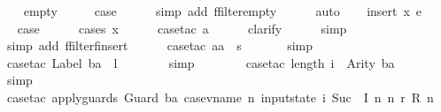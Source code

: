 \begin{isabellebody}
\ \ \isamarkupfalse%
\ empty\isanewline
\ \ \isamarkupfalse%
\ \isamarkupfalse%
\ {\isacharquery}case\isanewline
\ \ \ \ \isamarkupfalse%
\ {\isacharparenleft}simp\ add{\isacharcolon}\ ffilter{\isacharunderscore}empty{\isacharparenright}\isanewline
\ \ \ \ \isamarkupfalse%
\ auto\isanewline
{}\isamarkupfalse%
\isanewline
\ \ \isamarkupfalse%
\ {\isacharparenleft}insert\ x\ e{\isacharparenright}\isanewline
\ \ \isamarkupfalse%
\ \isamarkupfalse%
\ {\isacharquery}case\isanewline
\ \ \ \ \isamarkupfalse%
\ {\isacharparenleft}cases\ x{\isacharparenright}\isanewline
\ \ \ \ \isamarkupfalse%
\ {\isacharparenleft}case{\isacharunderscore}tac\ a{\isacharparenright}\isanewline
\ \ \ \ \isamarkupfalse%
\ clarify\isanewline
\ \ \ \ \isamarkupfalse%
\ simp\isanewline
\ \ \ \ \isamarkupfalse%
\ {\isacharparenleft}simp\ add{\isacharcolon}\ ffilter{\isacharunderscore}finsert{\isacharparenright}\isanewline
\ \ \ \ \isamarkupfalse%
\ {\isacharparenleft}case{\isacharunderscore}tac\ {\isachardoublequoteopen}aa\ {\isacharequal}\ s{\isachardoublequoteclose}{\isacharparenright}\isanewline
\ \ \ \ \ \isamarkupfalse%
\ simp\isanewline
\ \ \ \ \ \isamarkupfalse%
\ {\isacharparenleft}case{\isacharunderscore}tac\ {\isachardoublequoteopen}Label\ ba\ {\isacharequal}\ l{\isachardoublequoteclose}{\isacharparenright}\isanewline
\ \ \ \ \ \ \isamarkupfalse%
\ simp\isanewline
\ \ \ \ \ \ \isamarkupfalse%
\ {\isacharparenleft}case{\isacharunderscore}tac\ {\isachardoublequoteopen}length\ i\ {\isacharequal}\ Arity\ ba{\isachardoublequoteclose}{\isacharparenright}\isanewline
\ \ \ \ \ \ \ \isamarkupfalse%
\ simp\isanewline
\ \ \ \ \ \ \ \isamarkupfalse%
\ {\isacharparenleft}case{\isacharunderscore}tac\ {\isachardoublequoteopen}apply{\isacharunderscore}guards\ {\isacharparenleft}Guard\ ba{\isacharparenright}\ {\isacharparenleft}case{\isacharunderscore}vname\ {\isacharparenleft}{\isasymlambda}n{\isachardot}\ input{}state\ i\ {\isacharparenleft}Suc\ {}{\isacharparenright}\ {\isacharparenleft}I\ n{\isacharparenright}{\isacharparenright}\ {\isacharparenleft}{\isasymlambda}n{\isachardot}\ r\ {\isacharparenleft}R\ n{\isacharparenright}{\isacharparenright}{\isacharparenright}{\isachardoublequoteclose}{\isacharparenright}\isanewline

\end{isabellebody}

